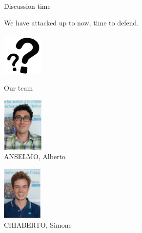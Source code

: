 \documentclass[aspectratio=169, handout]{beamer}
\begin{document}
\begin{frame}[c]{Discussion time}
  \begin{center}
    We have attacked up to now, time to defend.\\
    \Huge{\color{red}{Questions?}}\\
    \vfill
    \hfill
    \includegraphics[height=2cm]{./graphics/qm}
  \end{center}
\end{frame}

\begin{frame}{Our team}
  \noindent
  \begin{minipage}[l][\dimexpr.45\textheight-2\fboxsep-2\fboxrule\relax][t]{\dimexpr .495\textwidth-2\fboxsep-2\fboxrule\relax}
      \begin{center}
        \includegraphics[height=2.7cm]{./graphics/anselmo}\\
        ANSELMO, Alberto
      \end{center}
  \end{minipage}%
  \hfill
  \begin{minipage}[r][\dimexpr 0.45\textheight-2\fboxsep-2\fboxrule\relax][t]{\dimexpr .495\textwidth-2\fboxsep-2\fboxrule\relax}%
      \begin{center}
        \includegraphics[height=2.7cm]{./graphics/chiaberto}\\
        CHIABERTO, Simone
      \end{center}
  \end{minipage}%
  \vfill
  \noindent
  \begin{minipage}[l][\dimexpr 0.45\textheight-2\fboxsep-2\fboxrule\relax][t]{\dimexpr .495\textwidth-2\fboxsep-2\fboxrule\relax}%

\end{minipage}
\end{frame}
\end{document}
